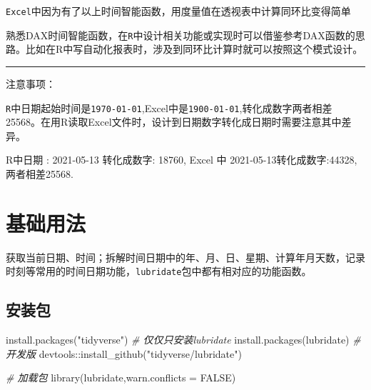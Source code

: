 \documentclass[
]{book}
\newenvironment{Shaded}{\begin{snugshade}}{\end{snugshade}}
\newcommand{\AttributeTok}[1]{\textcolor[rgb]{0.77,0.63,0.00}{#1}}
\newcommand{\CommentTok}[1]{\textcolor[rgb]{0.56,0.35,0.01}{\textit{#1}}}
\newcommand{\ConstantTok}[1]{\textcolor[rgb]{0.00,0.00,0.00}{#1}}
\newcommand{\FunctionTok}[1]{\textcolor[rgb]{0.00,0.00,0.00}{#1}}
\newcommand{\NormalTok}[1]{#1}
\newcommand{\SpecialCharTok}[1]{\textcolor[rgb]{0.00,0.00,0.00}{#1}}
\newcommand{\StringTok}[1]{\textcolor[rgb]{0.31,0.60,0.02}{#1}}
\begin{document}
\texttt{Excel}中因为有了以上时间智能函数，用度量值在透视表中计算同环比变得简单

熟悉DAX时间智能函数，在\texttt{R}中设计相关功能或实现时可以借鉴参考DAX函数的思路。比如在R中写自动化报表时，涉及到同环比计算时就可以按照这个模式设计。

\begin{center}\rule{0.5\linewidth}{0.5pt}\end{center}

注意事项：

\texttt{R}中日期起始时间是\texttt{1970-01-01},Excel中是\texttt{1900-01-01},转化成数字两者相差25568。在用R读取Excel文件时，设计到日期数字转化成日期时需要注意其中差异。

R中日期 : 2021-05-13 转化成数字: 18760,
Excel 中 2021-05-13转化成数字:44328,两者相差25568.

\hypertarget{ux57faux7840ux7528ux6cd5-1}{%
\section{基础用法}\label{ux57faux7840ux7528ux6cd5-1}}

获取当前日期、时间；拆解时间日期中的年、月、日、星期、计算年月天数，记录时刻等常用的时间日期功能，\texttt{lubridate}包中都有相对应的功能函数。

\hypertarget{ux5b89ux88c5ux5305}{%
\subsection{安装包}\label{ux5b89ux88c5ux5305}}

\begin{Shaded}
\begin{Highlighting}[]
\FunctionTok{install.packages}\NormalTok{(}\StringTok{"tidyverse"}\NormalTok{)}
\CommentTok{\# 仅仅只安装lubridate}
\FunctionTok{install.packages}\NormalTok{(}\StringTok{\textquotesingle{}lubridate\textquotesingle{}}\NormalTok{)}
\CommentTok{\# 开发版}
\NormalTok{devtools}\SpecialCharTok{::}\FunctionTok{install\_github}\NormalTok{(}\StringTok{"tidyverse/lubridate"}\NormalTok{)}
\end{Highlighting}
\end{Shaded}

\begin{Shaded}
\begin{Highlighting}[]
\CommentTok{\# 加载包}
\FunctionTok{library}\NormalTok{(lubridate,}\AttributeTok{warn.conflicts =} \ConstantTok{FALSE}\NormalTok{)}
\end{Highlighting}
\end{Shaded}
\end{document}
